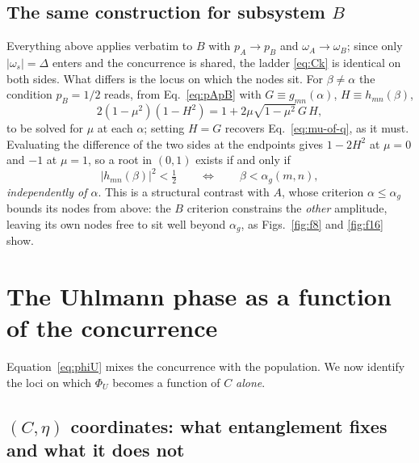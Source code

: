 \documentclass[11pt]{article}
\begin{document}
\subsection{The same construction for subsystem $B$}

Everything above applies verbatim to $B$ with $p_A\to p_B$ and
$\omega_A\to\omega_B$; since only $|\omega_s|=\Delta$ enters and the
concurrence is shared, the ladder \eqref{eq:Ck} is identical on both sides.
What differs is the locus on which the nodes sit. For $\beta\neq\alpha$ the
condition $p_B=1/2$ reads, from Eq.~\eqref{eq:pApB} with
$G\equiv g_{mn}(\alpha)$, $H\equiv h_{mn}(\beta)$,
\begin{equation}
2(1-\mu^2)(1-H^2)=1+2\mu\sqrt{1-\mu^2}\,G\,H ,
\label{eq:pB-half}
\end{equation}
to be solved for $\mu$ at each $\alpha$; setting $H=G$ recovers
Eq.~\eqref{eq:mu-of-q}, as it must. Evaluating the difference of the two sides
at the endpoints gives $1-2H^2$ at $\mu=0$ and $-1$ at $\mu=1$, so a root in
$(0,1)$ exists if and only if
\begin{equation}
|h_{mn}(\beta)|^2<\tfrac12
\qquad\Longleftrightarrow\qquad
\beta<\alpha_g(m,n),
\label{eq:B-existence}
\end{equation}
\emph{independently of $\alpha$}. This is a structural contrast with $A$, whose
criterion $\alpha\le\alpha_g$ bounds its nodes from above: the $B$ criterion
constrains the \emph{other} amplitude, leaving its own nodes free to sit well
beyond $\alpha_g$, as Figs.~\ref{fig:f8} and \ref{fig:f16} show.

\section{The Uhlmann phase as a function of the concurrence}
\label{sec:uhlmann-vs-C}

Equation~\eqref{eq:phiU} mixes the concurrence with the population. We now
identify the loci on which $\Phi_U$ becomes a function of $C$ \emph{alone}.

\subsection{$(C,\eta)$ coordinates: what entanglement fixes and what it does not}
\end{document}
